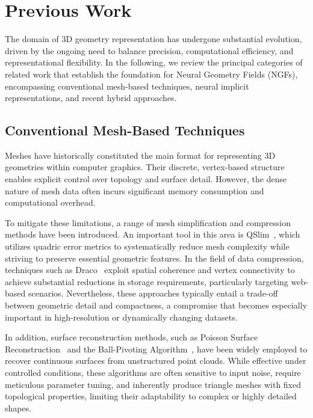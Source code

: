 \section{Previous Work}\label{sec:PreviousWork}
The domain of 3D geometry representation has undergone substantial evolution, driven by the ongoing need to balance precision, computational efficiency, and representational flexibility.
In the following, we review the principal categories of related work that establish the foundation for Neural Geometry Fields (NGFs), encompassing conventional mesh-based techniques, neural implicit representations, and recent hybrid approaches.

\subsection{Conventional Mesh-Based Techniques}
Meshes have historically constituted the main format for representing 3D geometries within computer graphics.
Their discrete, vertex-based structure enables explicit control over topology and surface detail.
However, the dense nature of mesh data often incurs significant memory consumption and computational overhead.

To mitigate these limitations, a range of mesh simplification and compression methods have been introduced.
An important tool in this area is QSlim~\cite{garland1997surface}, which utilizes quadric error metrics to systematically reduce mesh complexity while striving to preserve essential geometric features.
In the field of data compression, techniques such as Draco~\cite{sajnani2020draco} exploit spatial coherence and vertex connectivity to achieve substantial reductions in storage requirements, particularly targeting web-based scenarios.
Nevertheless, these approaches typically entail a trade-off between geometric detail and compactness, a compromise that becomes especially important in high-resolution or dynamically changing datasets.

In addition, surface reconstruction methods, such as Poisson Surface Reconstruction~\cite{kazhdan2006poisson} and the Ball-Pivoting Algorithm~\cite{bernardini1999ball}, have been widely employed to recover continuous surfaces from unstructured point clouds.
While effective under controlled conditions, these algorithms are often sensitive to input noise, require meticulous parameter tuning, and inherently produce triangle meshes with fixed topological properties, limiting their adaptability to complex or highly detailed shapes.

